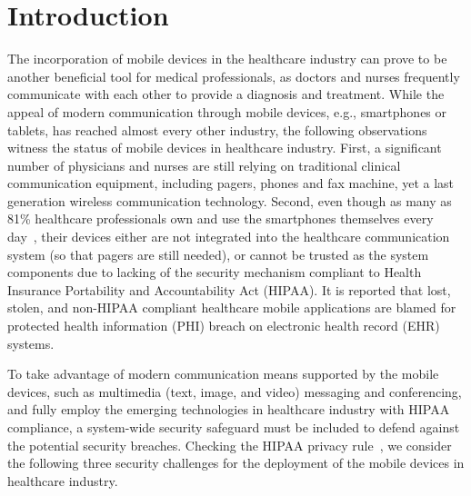 \section{Introduction}

The incorporation of mobile devices in the healthcare industry can prove to be
another beneficial tool for medical professionals, as doctors and nurses
frequently communicate with each other to provide a diagnosis and treatment.
While the appeal of modern communication through mobile devices, e.g.,
smartphones or tablets, has reached almost every other industry, the following
observations witness the status of mobile devices in healthcare industry.
First, a significant number of physicians and nurses are still relying on
traditional clinical communication equipment, including pagers, phones and fax
machine, yet a last generation wireless communication technology. Second, even
though as many as 81\% healthcare professionals own and use the smartphones
themselves every day~\cite{manhattan}, their devices either are not integrated
into the healthcare communication system (so that pagers are still needed), or
cannot be trusted as the system components due to lacking of the security
mechanism compliant to Health Insurance Portability and Accountability Act
(HIPAA). It is reported \cite{mdnews} that lost, stolen, and non-HIPAA
compliant healthcare mobile applications are blamed for protected health
information (PHI) breach on electronic health record (EHR) systems. 

To take advantage of modern communication means supported by the mobile
devices, such as multimedia (text, image, and video) messaging and
conferencing, and fully employ the emerging technologies in healthcare industry
with HIPAA compliance, a system-wide security safeguard must be included to
defend against the potential security breaches. Checking the HIPAA privacy
rule~\cite{hipaarule}, we consider the following three security challenges for
the deployment of the mobile devices in healthcare industry.

